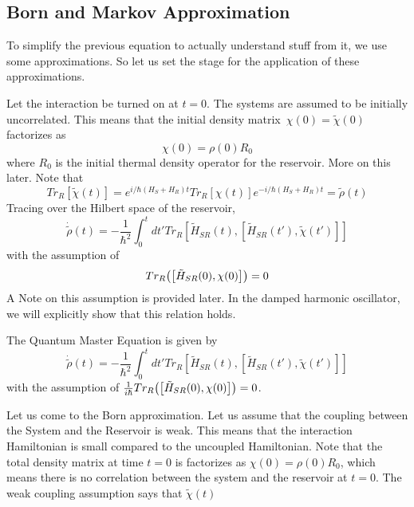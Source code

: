 \documentclass{scrartcl}
\newcommand{\1}{\mathbbm{1}}
\begin{document}
\subsection{Born and Markov Approximation}
To simplify the previous equation to actually understand stuff from it, we use some approximations. So let us set the stage 
for the application of these approximations.

Let the interaction be turned on at $t=0$. The systems are assumed to be initially uncorrelated. This means that the initial density matrix\
$\chi(0) = \tilde{\chi}(0)$ factorizes as 
\begin{equation}
    \chi(0) = \rho(0) R_0
\end{equation}
where $R_0$ is the initial thermal density operator for the reservoir. More on this later. Note that 
\begin{equation*}
    Tr_R[\tilde{\chi}(t)] = e^{i\slash \hbar (H_S + H_R)t} Tr_R[\chi (t)] e^{-i\slash \hbar (H_S + H_R)t} = \tilde{\rho}(t)
\end{equation*}
Tracing over the Hilbert space of the reservoir, 
\begin{equation*}
    \dot{\tilde{\rho}}(t) = -\frac{1}{\hbar^2} \int_0^t dt' Tr_R[\tilde{H}_{SR}(t), [\tilde{H}_{SR}(t'), \tilde{\chi}(t')]]
\end{equation*}
with the assumption of 
\begin{equation}
    Tr_R\qty(\qty[\tilde{H}_{SR}(0),\chi (0)]) = 0
\end{equation}
A Note on this assumption is provided later. In the damped harmonic oscillator, we will explicitly show
that this relation holds.
\begin{definition}
    The Quantum Master Equation is given by 
    \begin{equation}
        \dot{\tilde{\rho}}(t) = -\frac{1}{\hbar^2} \int_0^t dt' Tr_R[\tilde{H}_{SR}(t), [\tilde{H}_{SR}(t'), \tilde{\chi}(t')]]
    \end{equation}
    with the assumption of $\frac{1}{i\hbar} Tr_R\qty(\qty[\tilde{H}_{SR}(0),\chi (0)]) = 0$.
\end{definition}
Let us come to the Born approximation. Let us assume that the coupling between the System and the Reservoir is weak. 
This means that the interaction Hamiltonian is small compared to the uncoupled Hamiltonian. Note that the total 
density matrix at time $t=0$ is factorizes as $\chi(0) = \rho(0) R_0$, which means there is no correlation 
between the system and the reservoir at $t=0$. The weak coupling assumption says that $\tilde{\chi}(t)$
\end{document}
